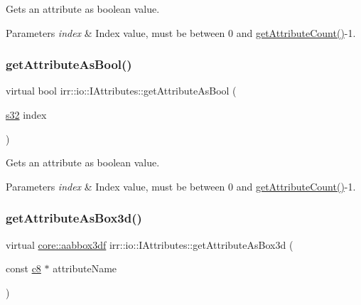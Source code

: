 Gets an attribute as boolean value. 


\begin{DoxyParams}{Parameters}
{\em index} & Index value, must be between 0 and \hyperlink{classirr_1_1io_1_1IAttributes_a796bdd9440ee7ba0b6742a90a82870b6}{get\+Attribute\+Count()}-\/1. \\
\hline
\end{DoxyParams}
\mbox{\label{classirr_1_1io_1_1IAttributes_acf9dc477c8610923c373d2ad15ff7752}} 
\subsubsection{\texorpdfstring{get\+Attribute\+As\+Bool()}{getAttributeAsBool()}\hspace{0.1cm}{\footnotesize\ttfamily [4/4]}}
{\footnotesize\ttfamily virtual bool irr\+::io\+::\+I\+Attributes\+::get\+Attribute\+As\+Bool (\begin{DoxyParamCaption}\item[{\hyperlink{namespaceirr_ac66849b7a6ed16e30ebede579f9b47c6}{s32}}]{index }\end{DoxyParamCaption})\hspace{0.3cm}{\ttfamily [pure virtual]}}



Gets an attribute as boolean value. 


\begin{DoxyParams}{Parameters}
{\em index} & Index value, must be between 0 and \hyperlink{classirr_1_1io_1_1IAttributes_a796bdd9440ee7ba0b6742a90a82870b6}{get\+Attribute\+Count()}-\/1. \\
\hline
\end{DoxyParams}
\mbox{\label{classirr_1_1io_1_1IAttributes_a215218b9b1ebb8313557b44bb3bce363}} 
\subsubsection{\texorpdfstring{get\+Attribute\+As\+Box3d()}{getAttributeAsBox3d()}\hspace{0.1cm}{\footnotesize\ttfamily [1/4]}}
{\footnotesize\ttfamily virtual \hyperlink{namespaceirr_1_1core_a60f4b4c744aba55f10530d503c6ecb04}{core\+::aabbox3df} irr\+::io\+::\+I\+Attributes\+::get\+Attribute\+As\+Box3d (\begin{DoxyParamCaption}\item[{const \hyperlink{namespaceirr_a9395eaea339bcb546b319e9c96bf7410}{c8} $\ast$}]{attribute\+Name }\end{DoxyParamCaption})\hspace{0.3cm}{\ttfamily [pure virtual]}}



